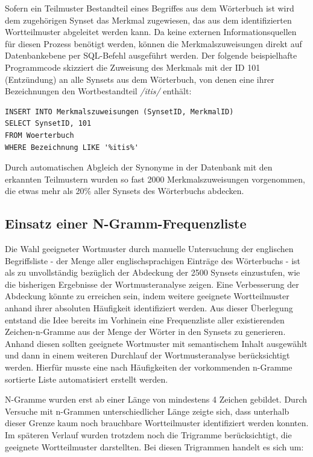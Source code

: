 \documentclass[pagesize,paper=A4,DIV=calc,fontsize=12pt,draft=false]{scrreprt}
\begin{document}
Sofern ein Teilmuster Bestandteil eines Begriffes aus dem Wörterbuch ist wird dem zugehörigen Synset das Merkmal zugewiesen, das aus dem identifizierten Wortteilmuster abgeleitet werden kann. 
Da keine externen Informationsquellen für diesen Prozess benötigt werden, können die Merkmalszuweisungen direkt auf Datenbankebene per SQL-Befehl ausgeführt werden. 
Der folgende beispielhafte Programmcode skizziert die Zuweisung des Merkmals mit der ID 101 (Entzündung) an alle Synsets aus dem Wörterbuch, von denen eine ihrer Bezeichnungen den Wortbestandteil \emph{/itis/} enthält: 

\lstset{
language=SQL
}

\begin{lstlisting}[caption={Merkmalszuweisung der ID 101 (Entzündung) an Synsets mit dem Wortbestandteil \emph{/itis/}}]
INSERT INTO Merkmalszuweisungen (SynsetID, MerkmalID) 
SELECT SynsetID, 101 
FROM Woerterbuch 
WHERE Bezeichnung LIKE '%itis%'
\end{lstlisting}

Durch automatischen Abgleich der Synonyme in der Datenbank mit den erkannten Teilmustern wurden so fast 2000 Merkmalszuweisungen vorgenommen, die etwas mehr als 20\% aller Synsets des Wörterbuchs abdecken. 

\subsection{Einsatz einer N-Gramm-Frequenzliste}

Die Wahl geeigneter Wortmuster durch manuelle Untersuchung der englischen Begriffsliste - der Menge aller englischsprachigen Einträge des Wörterbuchs - ist als zu unvollständig bezüglich der Abdeckung der 2500 Synsets einzustufen, wie die bisherigen Ergebnisse der Wortmusteranalyse zeigen. 
Eine Verbesserung der Abdeckung könnte zu erreichen sein, indem weitere geeignete Wortteilmuster anhand ihrer absoluten Häufigkeit identifiziert werden. 
Aus dieser Überlegung entstand die Idee bereits im Vorhinein eine Frequenzliste aller existierenden Zeichen-n-Gramme aus der Menge der Wörter in den Synsets zu generieren.
Anhand diesen sollten geeignete Wortmuster mit semantischem Inhalt ausgewählt und dann in einem weiteren Durchlauf der Wortmusteranalyse berücksichtigt werden. 
Hierfür musste eine nach Häufigkeiten der vorkommenden n-Gramme sortierte Liste automatisiert erstellt werden. 

N-Gramme wurden erst ab einer Länge von mindestens 4 Zeichen gebildet. 
Durch Versuche mit n-Grammen unterschiedlicher Länge zeigte sich, dass unterhalb dieser Grenze kaum noch brauchbare Wortteilmuster identifiziert werden konnten. 
Im späteren Verlauf wurden trotzdem noch die Trigramme berücksichtigt, die geeignete Wortteilmuster darstellten. 
Bei diesen Trigrammen handelt es sich um:
\end{document}
